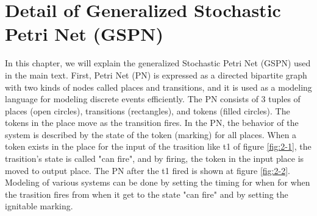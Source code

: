 %
%

\chapter{Detail of Generalized Stochastic Petri Net (GSPN)}{\label{sec:app}}
In this chapter, we will explain the generalized Stochastic Petri Net (GSPN) used in the main text.
First, Petri Net (PN) is expressed as a directed bipartite graph with two kinds of nodes called places and transitions, and it is used as a modeling language for modeling discrete events efficiently.
The PN consists of 3 tuples of places (open circles), transitions (rectangles), and tokens (filled circles).
The tokens in the place move as the transition fires.
In the PN, the behavior of the system is described by the state of the token (marking) for all places.
When a token exists in the place for the input of the trasition like t1 of figure \ref{fig:2-1}, the trasition's state is called "can fire", and by firing, the token in the input place is moved to output place.
The PN after the t1 fired is shown at figure  \ref{fig:2-2}.
Modeling of various systems can be done by setting the timing for when for when the trasition fires from when it get to the state "can fire" and by setting the ignitable marking.

